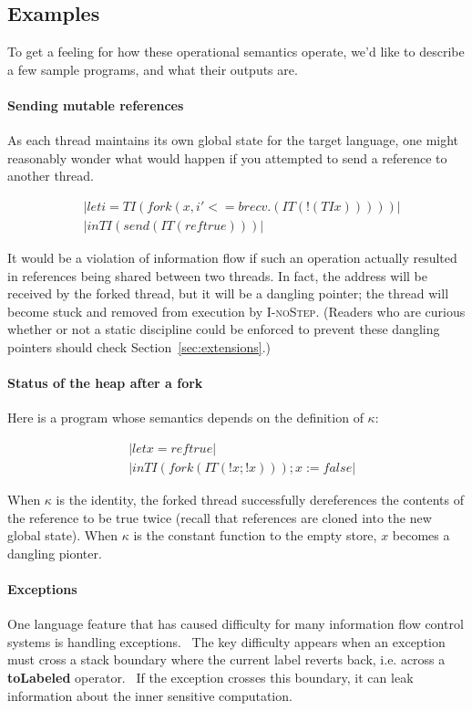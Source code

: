 \subsection{Examples}

To get a feeling for how these operational semantics operate, we'd like to
describe a few sample programs, and what their outputs are.

\paragraph{Sending mutable references}  As each thread maintains its own
global state for the target language, one might reasonably wonder what would
happen if you attempted to send a reference to another thread.

\begin{align*}
    & |let i = TI (fork (x, i' <= brecv . (IT (!(TI x)))))| \\
    & |in TI (send (IT (ref true)))|
\end{align*}

It would be a violation of information flow if such an operation actually
resulted in references being shared between two threads.  In fact, the address
will be received by the forked thread, but it will be a dangling pointer; the
thread will become stuck and removed from execution by \textsc{I-noStep}.  (Readers
who are curious whether or not a static discipline could be enforced to
prevent these dangling pointers should check Section~\ref{sec:extensions}.)

\paragraph{Status of the heap after a fork}  Here is a program whose
semantics depends on the definition of $\kappa$:

\begin{align*}
    & |let x = ref true| \\
    & |in TI (fork (IT (!x; !x))); x := false|
\end{align*}

When $\kappa$ is the identity, the forked thread successfully dereferences
the contents of the reference to be true twice (recall that references
are cloned into the new global state).  When $\kappa$ is the constant function
to the empty store, $x$ becomes a dangling pionter.

\paragraph{Exceptions}  One language feature that has caused difficulty
for many information flow control systems is handling
exceptions.~\cite{Hritcu:2013:YIB:2497621.2498098}  The key difficulty
appears when an exception must cross a stack boundary where the current
label reverts back, i.e. across a \textbf{toLabeled} operator.~\cite{lio}
If the exception crosses this boundary, it can leak information about the
inner sensitive computation.

